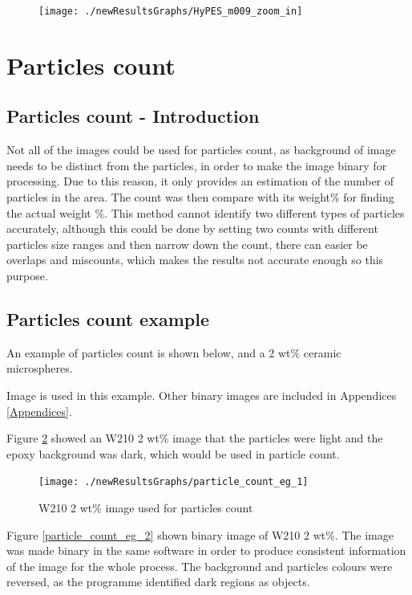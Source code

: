 \documentclass[numbers=noendperiod,chapterprefix=on]{icldt} %
\begin{document}
{\begin{figure}[!hp]
\centering
\texttt{[image: ./newResultsGraphs/HyPES\_m009\_zoom\_in]}
\caption{} \label{HyPES_m009_zoom_in}
\end{figure}
\FloatBarrier

\section{Particles count} \label{Particles_count}

\subsection{Particles count - Introduction}
Not all of the images could be used for particles count, as background of image needs to be distinct from the particles, in order to make the image binary for processing. Due to this reason, it only provides an estimation of the number of particles in the area. The count was then compare with its weight\% for finding the actual weight \%. 
This method cannot identify two different types of particles accurately, although this could be done by setting two counts with different particles size ranges and then narrow down the count, there can easier be overlaps and miscounts, which makes the results not accurate enough so this purpose.



\subsection{Particles count example}

An example of particles count is shown below, and a 2 wt\% ceramic microspheres.  

Image is used in this example. Other binary images are included in Appendices \ref{Appendices}.

Figure \ref{particle_count_eg_1} showed an W210 2 wt\% image that the particles were light and the epoxy background was dark, which would be used in particle count.

\begin{figure}[!hp]
\centering
\texttt{[image: ./newResultsGraphs/particle\_count\_eg\_1]}
\caption{W210 2 wt\% image used for particles count} \label{particle_count_eg_1}
\end{figure}
\FloatBarrier

Figure \ref{particle_count_eg_2} shown binary image of W210 2 wt\%. The image was made binary in the same software in order to produce consistent information of the image for the whole process. The background and particles colours were reversed, as the programme identified dark regions as objects.
 
}
\end{document}
